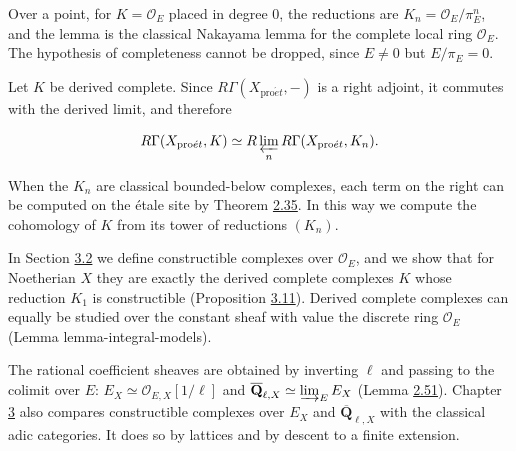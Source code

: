 \documentclass[11pt]{article}
\providecommand{\QbarX}{}\renewcommand{\QbarX}{\overline{\mathbf Q}_{\ell,X}}
\begin{document}
\label{bp192}%
Over a point, for \(K=\mathcal O_E\) placed in degree \(0\), the reductions are \(K_n=\mathcal O_E/\pi_E^n\), and the lemma is the classical Nakayama lemma for the complete local ring \(\mathcal O_E\). The hypothesis of completeness cannot be dropped, since \(E\neq0\) but \(E/\pi_E=0\).

Let \(K\) be derived complete. Since \(R\Gamma(X_{\mathrm{pro}\acute{e}t},-)\) is a right adjoint, it commutes with the derived limit, and therefore

\[
R\Gamma(X_{\mathrm{pro}\acute{e}t},K)
\simeq R\varprojlim_nR\Gamma(X_{\mathrm{pro}\acute{e}t},K_n).
\]

When the \(K_n\) are classical bounded-below complexes, each term on the right can be computed on the étale site by Theorem \hyperref[bp103]{2.35}. In this way we compute the cohomology of \(K\) from its tower of reductions \((K_n)\).

In Section \hyperref[bp197]{3.2} we define constructible complexes over \(\mathcal O_E\), and we show that for Noetherian \(X\) they are exactly the derived complete complexes \(K\) whose reduction \(K_1\) is constructible (Proposition \hyperref[bp226]{3.11}). Derived complete complexes can equally be studied over the constant sheaf with value the discrete ring \(\mathcal O_E\) (Lemma lemma-integral-models).

The rational coefficient sheaves are obtained by inverting \(\ell\) and passing to the colimit over \(E\): \(E_X\simeq\mathcal O_{E,X}[1/\ell]\) and \(\QbarX\simeq\varinjlim_E E_X\) (Lemma \hyperref[bp158]{2.51}). Chapter \hyperref[bp193]{3} also compares constructible complexes over \(E_X\) and \(\QbarX\) with the classical adic categories. It does so by lattices and by descent to a finite extension.



\end{document}
